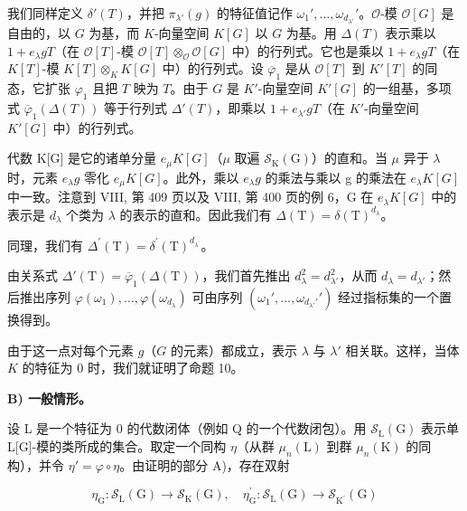 我们同样定义 \(\delta'(T)\)，并把 \(\pi_{\lambda'}(g)\) 的特征值记作 \(\omega_1', \ldots, \omega_{d_{\lambda'}}'\)。\(\mathcal{O}\)-模 \(\mathcal{O}[G]\) 是自由的，以 \(G\) 为基，而 \(K\)-向量空间 \(K[G]\) 以 \(G\) 为基。用 \(\Delta(T)\) 表示乘以 \(1 + e_{\lambda}gT\)（在 \(\mathcal{O}[T]\)-模 \(\mathcal{O}[T] \otimes_{\mathcal{O}} \mathcal{O}[G]\) 中）的行列式。它也是乘以 \(1 + e_{\lambda}gT\)（在 \(K[T]\)-模 \(K[T] \otimes_K K[G]\) 中）的行列式。设 \(\overline{\varphi}_1\) 是从 \(\mathcal{O}[T]\) 到 \(K'[T]\) 的同态，它扩张 \(\varphi_1\) 且把 \(T\) 映为 \(T\)。由于 \(G\) 是 \(K'\)-向量空间 \(K'[G]\) 的一组基，多项式 \(\overline{\varphi}_1(\Delta(T))\) 等于行列式 \(\Delta'(T)\)，即乘以 \(1 + e_{\lambda'}gT\)（在 \(K'\)-向量空间 \(K'[G]\) 中）的行列式。

代数 K{[}G{]} 是它的诸单分量 \(e_{\mu}K[G]\)（\(\mu\) 取遍 \(\mathcal{S}_{\mathrm{K}}(\mathrm{G})\)）的直和。当 \(\mu\) 异于 \(\lambda\) 时，元素 \(e_{\lambda}g\) 零化 \(e_{\mu}K[G]\)。此外，乘以 \(e_{\lambda}g\) 的乘法与乘以 g 的乘法在 \(e_{\lambda}K[G]\) 中一致。注意到 VIII, 第 409 页以及 VIII, 第 400 页的例 6，G 在 \(e_{\lambda}K[G]\) 中的表示是 \(d_{\lambda}\) 个类为 \(\lambda\) 的表示的直和。因此我们有 \(\Delta(\mathrm{T}) = \delta(\mathrm{T})^{d_{\lambda}}\)。

同理，我们有 \(\Delta^{\prime}(\mathrm{T}) = \delta^{\prime}(\mathrm{T})^{d_{\lambda^{\prime}}}\)。

由关系式 \(\Delta'(\mathrm{T}) = \overline{\varphi}_1(\Delta(\mathrm{T}))\)，我们首先推出 \(d_{\lambda}^2 = d_{\lambda'}^2\)，从而 \(d_{\lambda} = d_{\lambda'}\)；然后推出序列 \(\varphi(\omega_1), \ldots, \varphi(\omega_{d_\lambda})\) 可由序列 \((\omega_1', \ldots, \omega_{d_{\lambda'}'}')\) 经过指标集的一个置换得到。

由于这一点对每个元素 \(g\)（\(G\) 的元素）都成立，表示 \(\lambda\) 与 \(\lambda'\) 相关联。这样，当体 \(K\) 的特征为 0 时，我们就证明了命题 10。

\textbf{B) 一般情形。}

设 L 是一个特征为 0 的代数闭体（例如 Q 的一个代数闭包）。用 \(\mathcal{S}_{\mathrm{L}}(\mathrm{G})\) 表示单 L{[}G{]}-模的类所成的集合。取定一个同构 \(\eta\)（从群 \(\mu_{n}(\mathrm{L})\) 到群 \(\mu_{n}(\mathrm{K})\) 的同构），并令 \(\eta' = \varphi \circ \eta\)。由证明的部分 A)，存在双射

\[
\eta_ {\mathrm{G}}: \mathcal {S} _ {\mathrm{L}} (\mathrm{G}) \to \mathcal {S} _ {\mathrm{K}} (\mathrm{G}), \quad \eta_ {\mathrm{G}} ^ {\prime}: \mathcal {S} _ {\mathrm{L}} (\mathrm{G}) \to \mathcal {S} _ {\mathrm {K^ {\prime}}} (\mathrm{G})
\]

